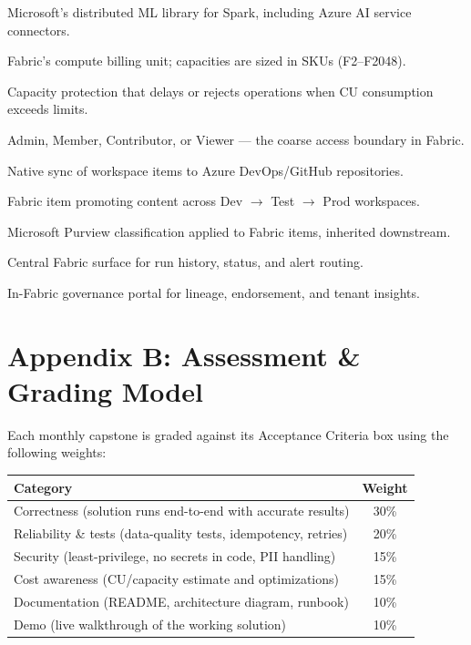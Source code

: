 \documentclass[11pt, a4paper]{article}
\begin{document}
\begin{description}[leftmargin=3.2cm, style=nextline]
    \item[SynapseML] Microsoft's distributed ML library for Spark, including Azure AI service connectors.
    \item[Capacity Unit (CU)] Fabric's compute billing unit; capacities are sized in SKUs (F2--F2048).
    \item[Throttling] Capacity protection that delays or rejects operations when CU consumption exceeds limits.
    \item[Workspace Role] Admin, Member, Contributor, or Viewer --- the coarse access boundary in Fabric.
    \item[Git Integration] Native sync of workspace items to Azure DevOps/GitHub repositories.
    \item[Deployment Pipeline] Fabric item promoting content across Dev $\rightarrow$ Test $\rightarrow$ Prod workspaces.
    \item[Sensitivity Label] Microsoft Purview classification applied to Fabric items, inherited downstream.
    \item[Monitoring Hub] Central Fabric surface for run history, status, and alert routing.
    \item[Purview Hub] In-Fabric governance portal for lineage, endorsement, and tenant insights.
\end{description}

\section{Appendix B: Assessment \& Grading Model}
Each monthly capstone is graded against its Acceptance Criteria box using the following weights:

\begin{center}
\begin{tabular}{@{} l c @{}}
\toprule
\textbf{Category} & \textbf{Weight} \\
\midrule
Correctness (solution runs end-to-end with accurate results) & 30\% \\
Reliability \& tests (data-quality tests, idempotency, retries) & 20\% \\
Security (least-privilege, no secrets in code, PII handling) & 15\% \\
Cost awareness (CU/capacity estimate and optimizations) & 15\% \\
Documentation (README, architecture diagram, runbook) & 10\% \\
Demo (live walkthrough of the working solution) & 10\% \\
\bottomrule
\end{tabular}
\end{center}
\end{document}
